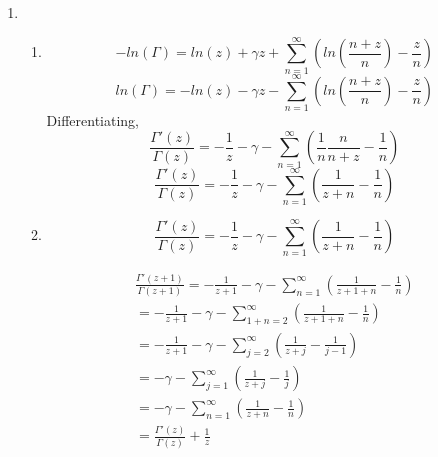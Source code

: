 \documentclass[a4paper]{article}
\begin{document}
\begin{enumerate}
\begin {enumerate}
\end{enumerate} 
\item
\begin{enumerate}
\item
\[ -ln(\Gamma) = ln(z) + \gamma z + \sum_{n=1}^\infty \left(ln(\frac{n+z}{n}) -\frac{z}{n} \right) \]
\[ ln(\Gamma) = -ln(z) - \gamma z - \sum_{n=1}^\infty \left(ln(\frac{n+z}{n}) -\frac{z}{n} \right) \]
Differentiating,
\[ \frac{\Gamma'(z)}{\Gamma(z)} = -\frac{1}{z} - \gamma - \sum_{n=1}^\infty \left( \frac{1}{n}\frac{n}{n+z} -\frac{1}{n} \right) \]
\[ \frac{\Gamma'(z)}{\Gamma(z)} = -\frac{1}{z} - \gamma - \sum_{n=1}^\infty \left( \frac{1}{z+n} -\frac{1}{n} \right) \]
\item 
\[ \frac{\Gamma'(z)}{\Gamma(z)} = -\frac{1}{z} - \gamma - \sum_{n=1}^\infty \left( \frac{1}{z+n} -\frac{1}{n} \right) \]
		                         	\begin{center}             
		                         		\begin{gather*}
 \frac{\Gamma'(z+1)}{\Gamma(z+1)} = -\frac{1}{z+1} - \gamma - \sum_{n=1}^\infty \left( \frac{1}{z+1+n} -\frac{1}{n} \right)
			\\ = -\frac{1}{z+1} - \gamma - \sum_{1+n=2}^\infty \left( \frac{1}{z+1+n} -\frac{1}{n} \right)
			\\ = -\frac{1}{z+1} - \gamma - \sum_{j=2}^\infty \left( \frac{1}{z+j} -\frac{1}{j-1} \right)
			\\ =  - \gamma - \sum_{j=1}^\infty \left( \frac{1}{z+j} -\frac{1}{j} \right)
			\\ =  - \gamma - \sum_{n=1}^\infty \left( \frac{1}{z+n} -\frac{1}{n} \right)
			\\=\frac{\Gamma'(z)}{\Gamma(z)}  +\frac{1}{z}				                         			\end{gather*} 
		                         		\end{center}
		                         		

\end{enumerate}
\end{enumerate}
\end{document}
